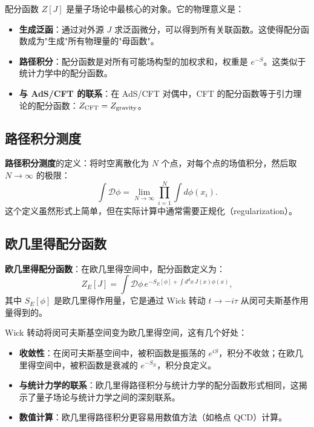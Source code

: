 \begin{note}[配分函数的物理意义]
配分函数 $Z[J]$ 是量子场论中最核心的对象。它的物理意义是：
\begin{itemize}
    \item \textbf{生成泛函}：通过对外源 $J$ 求泛函微分，可以得到所有关联函数。这使得配分函数成为"生成"所有物理量的"母函数"。
    \item \textbf{路径积分}：配分函数是对所有可能场构型的加权求和，权重是 $e^{-S}$。这类似于统计力学中的配分函数。
    \item \textbf{与 AdS/CFT 的联系}：在 AdS/CFT 对偶中，CFT 的配分函数等于引力理论的配分函数：$Z_{\rm CFT} = Z_{\rm gravity}$。
\end{itemize}
\end{note}

\subsection{路径积分测度}

\textbf{路径积分测度}的定义：将时空离散化为 $N$ 个点，对每个点的场值积分，然后取 $N \to \infty$ 的极限：
\begin{equation}
    \int \mathcal{D}\phi = \lim_{N \to \infty} \prod_{i=1}^{N} \int d\phi(x_i).
\end{equation}
这个定义虽然形式上简单，但在实际计算中通常需要正规化（regularization）。

\subsection{欧几里得配分函数}

\textbf{欧几里得配分函数}：在欧几里得空间中，配分函数定义为：
\begin{equation}
    Z_E[J] = \int \mathcal{D}\phi \, e^{-S_E[\phi] + \int d^d x \, J(x) \phi(x)},
\end{equation}
其中 $S_E[\phi]$ 是欧几里得作用量，它是通过 Wick 转动 $t \to -i\tau$ 从闵可夫斯基作用量得到的。

\begin{note}
Wick 转动将闵可夫斯基空间变为欧几里得空间，这有几个好处：
\begin{itemize}
    \item \textbf{收敛性}：在闵可夫斯基空间中，被积函数是振荡的 $e^{iS}$，积分不收敛；在欧几里得空间中，被积函数是衰减的 $e^{-S_E}$，积分良定义。
    \item \textbf{与统计力学的联系}：欧几里得路径积分与统计力学的配分函数形式相同，这揭示了量子场论与统计力学之间的深刻联系。
    \item \textbf{数值计算}：欧几里得路径积分更容易用数值方法（如格点 QCD）计算。
\end{itemize}
\end{note}


